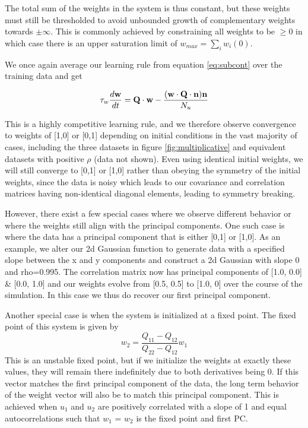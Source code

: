 \documentclass{article}
\begin{document}
The total sum of the weights in the system is thus constant, but these weights must still be thresholded to avoid unbounded growth of complementary weights towards $\pm \infty$. This is commonly achieved by constraining all weights to be $\geq 0$ in which case there is an upper saturation limit of $w_{max} = \sum_i{w_i(0)}$.

We once again average our learning rule from equation \ref{eq:subcont} over the training data and get

\begin{equation}\label{eq:subavg}
\tau_w \dfrac{d\bf{w}}{dt} = {\bf Q \cdot w} - \dfrac{({\bf w \cdot Q \cdot n}) {\bf n} }{N_u}
\end{equation}

This is a highly competitive learning rule, and we therefore observe convergence to weights of [1,0] or [0,1] depending on initial conditions in the vast majority of cases, including the three datasets in figure \ref{fig:multiplicative} and equivalent datasets with positive $\rho$ (data not shown).
Even using identical initial weights, we will still converge to [0,1] or [1,0] rather than obeying the symmetry of the initial weights, since the data is noisy which leads to our covariance and correlation matrices having non-identical diagonal elements, leading to symmetry breaking. 

However, there exist a few special cases where we observe different behavior or where the weights still align with the principal components. One such case is where the data has a principal component that is either [0,1] or [1,0]. As an example, we alter our 2d Gaussian function to generate data with a specified slope between the x and y components and construct a 2d Gaussian with slope 0 and rho=0.995. The correlation matrix now has principal components of [1.0, 0.0] \& [0.0, 1.0] and our weights evolve from [0.5, 0.5] to [1.0, 0] over the course of the simulation. In this case we thus do recover our first principal component.

Another special case is when the system is initialized at a fixed point. The fixed point of this system is given by
\begin{equation}
w_2 = \dfrac{Q_{11}-Q_{12}}{Q_{22}-Q_{12}}w_1
\end{equation}
This is an unstable fixed point, but if we initialize the weights at exactly these values, they will remain there indefinitely due to both derivatives being 0. If this vector matches the first principal component of the data, the long term behavior of the weight vector will also be to match this principal component. This is achieved when $u_1$ and $u_2$ are positively correlated with a slope of 1 and equal autocorrelations such that $w_1$ = $w_2$ is the fixed point and first PC.
\end{document}

